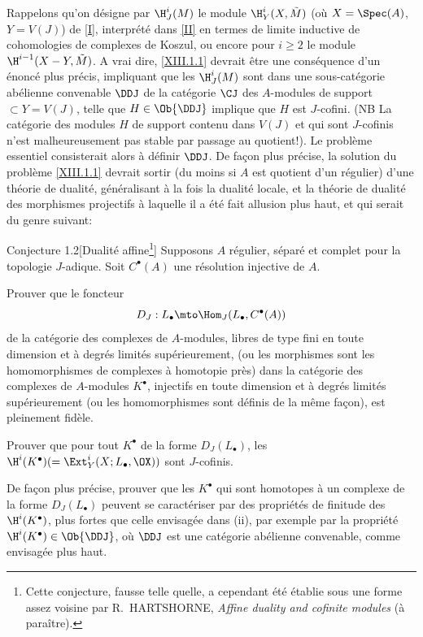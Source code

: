 Rappelons qu'on d\'esigne par $\H^i_J (M)$ le module $\H^i_Y (X, \tilde{M})$ (o\`u $X=\Spec (A)$, $Y=V(J)$) de \Exp \ref{I}, interpr\'et\'e dans \ref{II} en termes de limite inductive de cohomologies de complexes de Koszul, ou encore pour $i\ge 2$ le module $\H^{i-1} (X-Y, \tilde{M})$. A vrai dire, \ref{XIII.1.1} devrait \^etre une cons\'equence d'un \'enonc\'e plus pr\'ecis, impliquant que les $\H^i_J ({M})$ sont dans une sous-cat\'egorie ab\'elienne convenable ${\DDJ}$ de la cat\'egorie ${\CJ}$ des $A$-modules de support $\subset Y=V(J)$, telle que $H\in \Ob {\DDJ}$ implique que $H$ est $J$-cofini. (NB La cat\'egorie des modules $H$ de support contenu dans $V(J)$ et qui sont $J$-cofinis n'est malheureusement pas stable par passage au quotient!). Le probl\`eme essentiel consisterait alors \`a d\'efinir ${\DDJ}$. De fa\c con plus pr\'ecise, la solution du probl\`eme \ref{XIII.1.1} devrait sortir (du moins si $A$ est quotient d'un r\'egulier) d'une th\'eorie de dualit\'e, g\'en\'eralisant \`a la fois la dualit\'e locale, et la th\'eorie de dualit\'e des morphismes projectifs \`a laquelle il a \'et\'e fait allusion plus haut, et qui serait du genre suivant:

 \label{XIII.1.2}
\begin{enonce*}{Conjecture 1.2}[\og Dualit\'e affine\fg\footnote{Cette conjecture, fausse telle quelle, a cependant \'et\'e \'etablie sous une forme assez voisine par R.~HARTSHORNE, \emph{Affine duality and cofinite modules} (\`a para\^itre).}]
 Supposons $A$ r\'egulier, s\'epar\'e et complet pour la topologie $J$-adique. Soit $C^{\bullet}(A)$ une r\'esolution injective de $A$.
\begin{enumeratei}
\item
Prouver que le foncteur
$$D_J: L_{\bullet}\mto \Hom_J(L_{\bullet}, C^{\bullet}(A))$$
de la cat\'egorie des complexes de $A$-modules, libres de type fini en toute dimension et \`a degr\'es limit\'es sup\'erieurement, (ou les morphismes sont les homomorphismes de complexes \`a homotopie pr\`es) dans la cat\'egorie des complexes de $A$-modules $K^{\bullet}$, injectifs en toute dimension et \`a degr\'es limit\'es sup\'erieurement (ou les homomorphismes sont d\'efinis de la m\^eme fa\c con), est pleinement fid\`ele.

\item
Prouver que pour tout $K^{\bullet}$ de la forme $D_J(L_{\bullet})$, les $\H^i(K^{\bullet})(= \Ext_Y^i (X; L_{\bullet}, \OX))$ sont $J$-cofinis.

\item
De fa\c con plus pr\'ecise, prouver que les $K^{\bullet}$ qui sont homotopes \`a un complexe de la forme $D_J(L_{\bullet})$ peuvent se caract\'eriser par des propri\'et\'es de finitude des $\H^i(K^{\bullet})$, plus fortes que celle envisag\'ee dans (ii), par exemple par la propri\'et\'e $\H^i(K^{\bullet})\in \Ob {\DDJ}$, o\`u ${\DDJ}$ est une cat\'egorie ab\'elienne convenable, comme envisag\'ee plus haut.
\end{enumeratei}
\end{enonce*}


